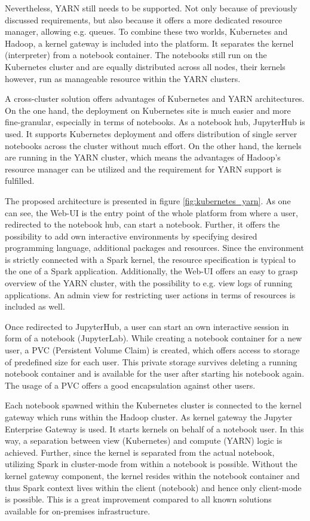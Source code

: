 \documentclass[a4paper,twoside]{article}
\begin{document}
Nevertheless, YARN still needs to be supported. Not only because of previously discussed requirements, but also because it offers a more dedicated resource manager, allowing e.g. queues. To combine these two worlds, Kubernetes and Hadoop, a kernel gateway is included into the platform. It separates the kernel (interpreter) from a notebook container. The notebooks still run on the Kubernetes cluster and are equally distributed across all nodes, their kernels however, run as manageable resource within the YARN clusters. 

A cross-cluster solution offers advantages of Kubernetes and YARN architectures. On the one hand, the deployment on Kubernetes site is much easier and more fine-granular, especially in terms of notebooks. As a notebook hub, JupyterHub is used. It supports Kubernetes deployment and offers distribution of single server notebooks across the cluster without much effort. On the other hand, the kernels are running in the YARN cluster, which means the advantages of Hadoop's resource manager can be utilized and the requirement for YARN support is fulfilled. 

The proposed architecture is presented in figure \ref{fig:kubernetes_yarn}. As one can see, the Web-UI is the entry point of the whole platform from where a user, redirected to the notebook hub, can start a notebook. Further, it offers the possibility to add own interactive environments by specifying desired programming language, additional packages and resources. Since the environment is strictly connected with a Spark kernel, the resource specification is typical to the one of a Spark application. Additionally, the Web-UI offers an easy to grasp overview of the YARN cluster, with the possibility to e.g. view logs of running applications. An admin view for restricting user actions in terms of resources is included as well. 

Once redirected to JupyterHub, a user can start an own interactive session in form of a notebook (JupyterLab). While creating a notebook container for a new user, a PVC (Persistent Volume Claim) is created, which offers access to storage of predefined size for each user. This private storage survives deleting a running notebook container and is available for the user after starting his notebook again. The usage of a PVC offers a good encapsulation against other users.

Each notebook spawned within the Kubernetes cluster is connected to the kernel gateway which runs within the Hadoop cluster. As kernel gateway the Jupyter Enterprise Gateway is used. It starts kernels on behalf of a notebook user. In this way, a separation between view (Kubernetes) and compute (YARN) logic is achieved. Further, since the kernel is separated from the actual notebook, utilizing Spark in cluster-mode from within a notebook is possible. Without the kernel gateway component, the kernel resides within the notebook container and thus Spark context lives within the client (notebook) and hence only client-mode is possible. This is a great improvement compared to all known solutions available for on-premises infrastructure. 
\end{document}
